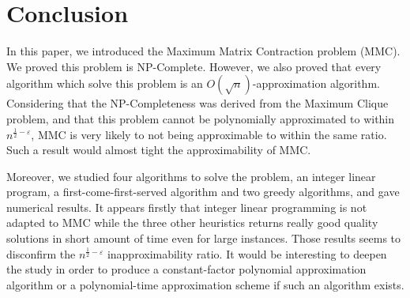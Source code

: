 \section{Conclusion}

In this paper, we introduced the Maximum Matrix Contraction problem (MMC). 
We proved this problem is NP-Complete. However, we also proved that every algorithm which solve this problem is an $O(\sqrt{n})$-approximation algorithm. Considering that the NP-Completeness was derived from the Maximum Clique problem, and that this problem cannot be polynomially approximated to within $n^{\frac{1}{2}-\varepsilon}$, MMC is very likely to not being approximable to within the same ratio. Such a result would almost tight the approximability of MMC.

Moreover, we studied four algorithms to solve the problem, an integer linear program, a first-come-first-served algorithm and two greedy algorithms, and gave numerical results. It appears firstly that integer linear programming is not adapted to MMC while the three other heuristics returns really good quality solutions in short amount of time even for large instances. Those results seems to disconfirm the $n^{\frac{1}{2}-\varepsilon}$ inapproximability ratio. It would be interesting to deepen the study in order to produce a constant-factor polynomial approximation algorithm or a polynomial-time approximation scheme if such an algorithm exists.
